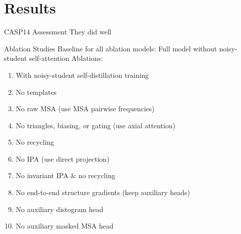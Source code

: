 \documentclass[presentation, smaller]{beamer}
\begin{document}
\section*{Results}
\label{sec:org5b6ce24}
\begin{frame}[label={sec:orgc7d9e17}]{CASP14 Assessment \cite{jumperHighlyAccurateProtein2021}}
They did well
\end{frame}
\begin{frame}[label={sec:org474fca0}]{Ablation Studies \cite{jumperHighlyAccurateProtein2021}}
Baseline for all ablation models: Full model without noisy-student self-attention  
Ablations:
\begin{enumerate}
\item With noisy-student self-distillation training
\item No templates
\item No raw MSA (use MSA pairwise frequencies)
\item No triangles, biasing, or gating (use axial attention)
\item No recycling
\item No IPA (use direct projection)
\item No invariant IPA \& no recycling
\item No end-to-end structure gradients (keep auxiliary heads)
\item No auxiliary distogram head
\item No auxiliary masked MSA head
\end{enumerate}
\end{frame}
\end{document}
